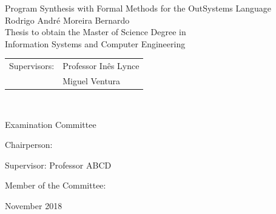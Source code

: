 \begin{center}

\vspace{2.5cm}

\vspace{1.0cm}
{\FontLb Program Synthesis with Formal Methods for the OutSystems Language} \\
\vspace{2.7cm}
{\FontMb Rodrigo André Moreira Bernardo} \\
\vspace{2.0cm}
{\FontSn Thesis to obtain the Master of Science Degree in} \\
\vspace{0.3cm}
{\FontLb Information Systems and Computer Engineering} \\
\vspace{1.1cm}
{\FontSn %
\begin{tabular}{ll}
	Supervisors: & Professor Inês Lynce \\
	             & Miguel Ventura \\
\end{tabular} } \\

\vspace{1.1cm}

{\FontMb Examination Committee} \\

\vspace{0.3cm}

{\FontSn %
Chairperson: 

Supervisor: Professor ABCD

Member of the Committee: 

}

\vspace{1.5cm}
{\FontMb November 2018} \\
%
\end{center}

\cleardoublepage

